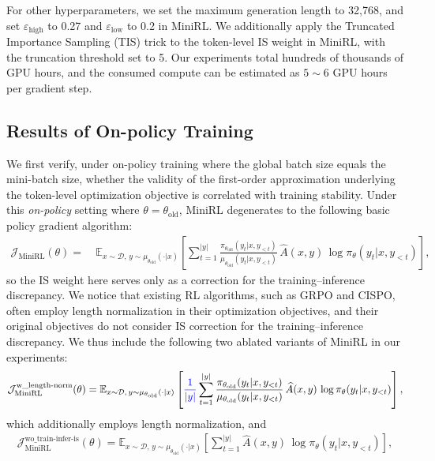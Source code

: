 \documentclass{article}
\begin{document}
For other hyperparameters, we set the maximum generation length to 32,768, and set \( \varepsilon_\text{high} \) to 0.27 and \( \varepsilon_\text{low} \) to 0.2 in MiniRL.
We additionally apply the Truncated Importance Sampling (TIS) trick \citep{yao2025offpolicy} to the token-level IS weight in MiniRL, with the truncation threshold set to 5.
Our experiments total hundreds of thousands of GPU hours, and the consumed compute can be estimated as \( 5 \sim 6 \) GPU hours per gradient step.

\subsection{Results of On-policy Training}
\label{subsec:on-policy}

We first verify, under on-policy training where the global batch size equals the mini-batch size, whether the validity of the first-order approximation underlying the token-level optimization objective is correlated with training stability.
Under this \textit{on-policy} setting where  \(\theta = \theta_\text{old}\), MiniRL degenerates to the following basic policy gradient algorithm:
\begin{align*}
\label{equ:minirl_onpolicy}
\mathcal{J}_\text{MiniRL}(\theta)
=&\
\mathbb{E}_{ x \sim \mathcal{D}, \, y \sim \mu_{ \theta_\text{old} } ( \cdot | x ) }
\left[ \sum_{t=1}^{|y|} 
\frac{ \pi_{ \theta_\text{old} } ( y_t | x, y_{<t} ) }{ \mu_{ \theta_\text{old} } ( y_t | x, y_{<t} ) } \,
\widehat{A}(x, y) \, 
\log \pi_\theta ( y_t | x, y_{<t} ) \right],
\end{align*}
so the IS weight here serves only as a correction for the training–inference discrepancy.
We notice that existing RL algorithms, such as GRPO and CISPO, often employ length normalization in their optimization objectives, and their original objectives do not consider IS correction for the training–inference discrepancy.
We thus include the following two ablated variants of MiniRL in our experiments:
\begin{align*}
\mathcal{J}^\text{w\_length-norm}_\text{MiniRL}(\theta)
=
\mathbb{E}_{ x \sim \mathcal{D}, \, y \sim \mu_{ \theta_\text{old} } ( \cdot | x ) } 
\left[ \textcolor{blue}{ \frac{1}{|y|} } \sum_{t=1}^{|y|} 
\frac{ \pi_{ \theta_\text{old} } ( y_t | x, y_{<t} ) }{ \mu_{ \theta_\text{old} } ( y_t | x, y_{<t} ) } \,
\widehat{A}(x, y) \, \log \pi_\theta ( y_t | x, y_{<t} ) \right],
\end{align*}
which additionally employs length normalization, and
\begin{align*}
\mathcal{J}^\text{wo\_train-infer-is}_\text{MiniRL}(\theta)
=
\mathbb{E}_{ x \sim \mathcal{D}, \, y \sim \mu_{ \theta_\text{old} } ( \cdot | x ) } 
\left[ \sum_{t=1}^{|y|} 
\widehat{A}(x, y) \, \log \pi_\theta ( y_t | x, y_{<t} ) \right],
\end{align*}
\end{document}
